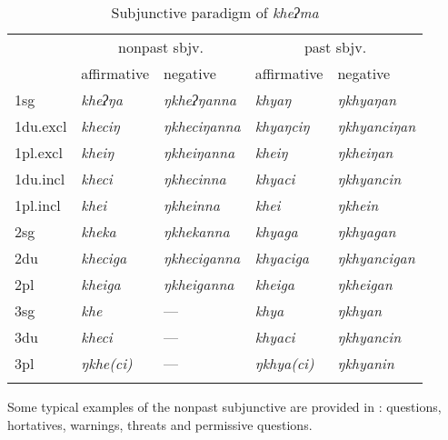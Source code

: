 \begin{table}[htp]
\begin{tabular}{lllll}
\lsptoprule
&\multicolumn{2}{c}{{\sc nonpast sbjv.}}&\multicolumn{2}{c}{{\sc past sbjv.}}\\
		&{\sc affirmative} & {\sc negative} & {\sc affirmative} & {\sc negative}  \\
\midrule
		{\sc 1sg}& \it kheʔŋa& \it ŋkheʔŋanna& \it khyaŋ& \it ŋkhyaŋan \\
		{\sc 1du.excl}& \it kheciŋ& \it ŋkheciŋanna& \it khyaŋciŋ& \it ŋkhyanciŋan \\
		{\sc 1pl.excl}& \it kheiŋ& \it ŋkheiŋanna& \it kheiŋ& \it ŋkheiŋan \\
		{\sc 1du.incl}& \it kheci& \it ŋkhecinna& \it khyaci& \it ŋkhyancin \\
		{\sc1pl.incl}& \it khei& \it ŋkheinna& \it khei& \it ŋkhein \\
\midrule
		{\sc 2sg}& \it kheka& \it ŋkhekanna& \it khyaga& \it ŋkhyagan \\
		{\sc 2du}& \it kheciga& \it ŋkheciganna& \it khyaciga& \it ŋkhyancigan \\
		{\sc2pl}& \it kheiga& \it ŋkheiganna& \it kheiga& \it ŋkheigan \\
\midrule
		{\sc 3sg}& \it khe& — & \it khya& \it ŋkhyan \\
		{\sc 3du}& \it kheci&   — & \it khyaci& \it ŋkhyancin \\
		{\sc 3pl}& \it ŋkhe(ci)&   — & \it ŋkhya(ci)& \it ŋkhyanin \\
\lspbottomrule	
\end{tabular}
\caption{Subjunctive paradigm of \emph{kheʔma} }\label{par-sbjv-intr}
\end{table}


  Some typical examples of the nonpast subjunctive are provided in \Next: questions, hortatives, warnings,  threats and permissive questions.   

